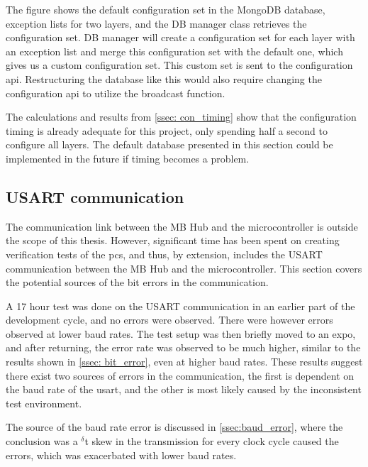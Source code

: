 \documentclass[main.tex]{subfiles}
\begin{document}
The figure shows the default configuration set in the MongoDB database, exception lists for two layers, and the DB manager class retrieves the configuration set. DB manager will create a configuration set for each layer with an exception list and merge this configuration set with the default one, which gives us a custom configuration set. This custom set is sent to the configuration \gls{api}. Restructuring the database like this would also require changing the configuration \gls{api} to utilize the broadcast function.

The calculations and results from \autoref{ssec: con_timing} show that the configuration timing is already adequate for this project, only spending half a second to configure all layers. The default database presented in this section could be implemented in the future if timing becomes a problem.


 
 
\subsection{USART communication}

The communication link between the MB Hub and the microcontroller is outside the scope of this thesis. However, significant time has been spent on creating verification tests of the \gls{pcs}, and thus, by extension, includes the USART communication between the MB Hub and the microcontroller. This section covers the potential sources of the bit errors in the communication.

A 17 hour test was done on the USART communication in an earlier part of the development cycle, and no errors were observed. There were however errors observed at lower baud rates. The test setup was then briefly moved to an expo, and after returning, the error rate was observed to be much higher, similar to the results shown in \autoref{ssec: bit_error}, even at higher baud rates. These results suggest there exist two sources of errors in the communication, the first is dependent on the baud rate of the \gls{usart}, and the other is most likely caused by the inconsistent test environment. 

The source of the baud rate error is discussed in \autoref{ssec:baud_error}, where the conclusion was a $^\delta$t skew in the transmission for every clock cycle caused the errors, which was exacerbated with lower baud rates.
\end{document}
